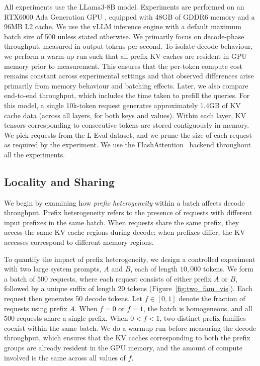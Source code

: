 All experiments use the LLama3-8B \cite{llama3modelcard} model. Experiments are performed on an RTX6000 Ada Generation GPU \cite{nvidia_rtx6000_datasheet}, equipped with 48GB of GDDR6 memory and a 96MB L2 cache. We use the vLLM \cite{kwon2023efficient} inference engine with a default maximum batch size of 500 unless stated otherwise. We primarily focus on decode-phase throughput, measured in output tokens per second. To isolate decode behaviour, we perform a warm-up run such that all prefix KV caches are resident in GPU memory prior to measurement. This ensures that the per-token compute cost remains constant across experimental settings and that observed differences arise primarily from memory behaviour and batching effects. Later, we also compare end-to-end throughput, which includes the time taken to prefill the queries. For this model, a single 10k-token request generates approximately 1.4GB of KV cache data (across all layers, for both keys and values). Within each layer, KV tensors corresponding to consecutive tokens are stored contiguously in memory. We pick requests from the L-Eval \cite{an2023leval} dataset, and we prune the size of each request as required by the experiment. We use the FlashAttention~\cite{dao2022flashattentionfastmemoryefficientexact} backend throughout all the experiments.

\subsection{Locality and Sharing}
We begin by examining how \textit{prefix heterogeneity} within a batch affects decode throughput.  Prefix heterogeneity refers to the presence of requests with different input prefixes in the same batch.  When requests share the same prefix, they access the same KV cache regions during decode; when prefixes differ, the KV accesses correspond to different memory regions.

To quantify the impact of prefix heterogeneity, we design a controlled experiment with two large system prompts, $A$ and $B$, each of length $10{,}000$ tokens. We form a batch of $500$ requests, where each request consists of either prefix $A$ or $B$, followed by a unique suffix of length $20$ tokens (Figure~\ref{fig:two_fam_vis}). Each request then generates 50 decode tokens. Let $f \in [0,1]$ denote the fraction of requests using prefix $A$. When $f=0$ or $f=1$, the batch is homogeneous, and all $500$ requests share a single prefix. When $0 < f < 1$, two distinct prefix families coexist within the same batch. We do a warmup run before measuring the decode throughput, which ensures that the KV caches corresponding to both the prefix groups are already resident in the GPU memory, and the amount of compute involved is the same across all values of $f$.

